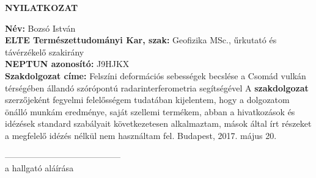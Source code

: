 \documentclass[12pt]{report}
\numberwithin{equation}{section}
\numberwithin{table}{section}
\numberwithin{figure}{section}
\begin{document}
\begin{center}
    {\LARGE \bf{NYILATKOZAT}}
\end{center}
\vspace{10mm}
{\bf Név:} Bozsó István\\
{\bf ELTE Természettudományi Kar, szak:} Geofizika MSc., űrkutató és
távérzékelő szakirány\\
{\bf NEPTUN azonosító:} J9HJKX\\
{\bf Szakdolgozat címe:} Felszíni deformációs sebességek becslése a Csomád vulkán térségében állandó szórópontú radarinterferometria segítségével
\newline{\quad}
\newline{\quad}
\newline{\quad}A {\bf szakdolgozat} szerzőjeként fegyelmi felelősségem tudatában kijelentem, hogy a dolgozatom önálló munkám eredménye, saját szellemi termékem, abban a hivatkozások és idézések standard szabályait következetesen alkalmaztam, mások által írt részeket a megfelelő idézés nélkül nem használtam fel.
\newline{\quad}
\newline{\quad}
\newline{\quad}
\newline{\quad}
Budapest, 2017. május 20.
\begin{flushright}
-----------------------------------------\\
\qquad a hallgató aláírása \qquad\qquad\qquad
\end{flushright}
\end{document}
